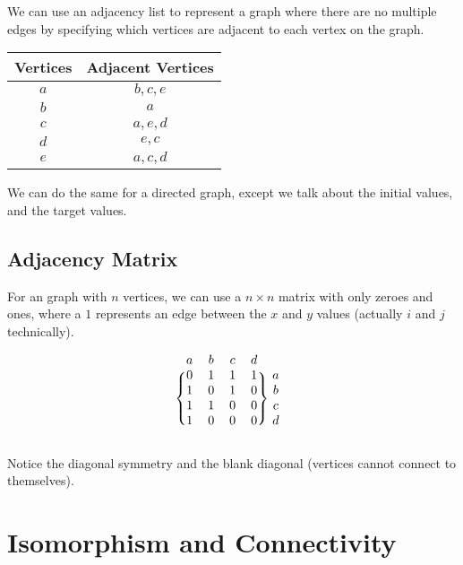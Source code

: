 We can use an adjacency list to represent a graph where there are no multiple edges by specifying which vertices are adjacent to each vertex on the graph.
\begin{center}
    \begin{tabular}{cc}
        \toprule
        Vertices & Adjacent Vertices \\
        \midrule
        \(a\)    & \(b, c, e\)       \\
        \(b\)    & \(a\)             \\
        \(c\)    & \(a, e, d\)       \\
        \(d\)    & \(e, c\)          \\
        \(e\)    & \(a, c, d\)       \\
        \bottomrule
    \end{tabular}
\end{center}
\begin{note}
    We can do the same for a directed graph, except we talk about the initial values, and the target values.
\end{note}

\subsection{Adjacency Matrix}\label{sub:adjacency_matrix}

For an graph with \(n\) vertices, we can use a \(n \times n\) matrix with only zeroes and ones, where a \(1\) represents an edge between the \(x\) and \(y\) values (actually \(i\) and \(j\) technically).

\[
    \begin{blockarray}{ccccc}
        a & b & c & d & \\
        \begin{block}{\{cccc\}c}
            0 & 1 & 1 & 1 & a \\
            1 & 0 & 1 & 0 & b \\
            1 & 1 & 0 & 0 & c \\
            1 & 0 & 0 & 0 & d \\
        \end{block}
    \end{blockarray}
\]
\begin{note}
    Notice the diagonal symmetry and the blank diagonal (vertices cannot connect to themselves).
\end{note}

\section{Isomorphism and Connectivity}\label{sec:isomorphism_and_connectivity}

